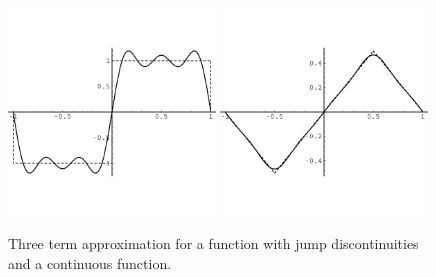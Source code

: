 \begin{Example}
  \begin{figure}[h!]
    \begin{center}
      \includegraphics[width=0.49\textwidth]{ode/fourier_series/cont0}
      \includegraphics[width=0.49\textwidth]{ode/fourier_series/cont1}
    \end{center}
    \caption{Three term approximation for a function with 
      jump discontinuities and a continuous function.} 
    \label{cont01}
  \end{figure}



\end{Example}
